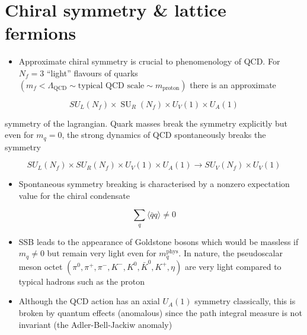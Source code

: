 \section{Chiral symmetry \& lattice fermions}

\begin{itemize}
  \item Approximate chiral symmetry is crucial to phenomenology of QCD. For $N_f = 3$ ``light'' flavours of quarks $(m_f < \Lambda_\text{QCD} \sim \text{typical QCD scale} \sim m_\text{proton})$ there is an approximate
\end{itemize}

\begin{equation}
S U_{L}\left(N_{f}\right) \times \operatorname{SU}_{R}\left(N_{f}\right) \times U_{V}(1) \times U_{A}(1)
\end{equation}

symmetry of the lagrangian. Quark masses break the symmetry explicitly but even for \(m_{q}=0\), the strong dynamics of QCD spontaneously breaks the symmetry

\begin{equation}
S U_{L}\left(N_{f}\right) \times S U_{R}\left(N_{f}\right) \times U_{V}(1) \times U_{A}(1) \rightarrow S U_{V}\left(N_{f}\right) \times U_{V}(1)
\end{equation}

\begin{itemize}
  \item Spontaneous symmetry breaking is characterised by a nonzero expectation value for the chiral condensate
\end{itemize}

\begin{equation}
\sum_{q}\langle\bar{q} q\rangle \neq 0
\end{equation}

\begin{itemize}
    \item SSB leads to the appearance of Goldstone bosons which would be massless if $m_q \neq 0$ but remain very light even for $m_q^\text{phys}$. In nature, the pseudoscalar meson octet $(\pi^0, \pi^+, \pi^-, K^-, K^0, \bar{K}^0, K^+, \eta)$ are very light compared to typical hadrons such as the proton
    \item Although the QCD action has an axial $U_A(1)$ symmetry classically, this is broken by quantum effects (anomalous) since the path integral measure is not invariant (the Adler-Bell-Jackiw anomaly)
\end{itemize}

